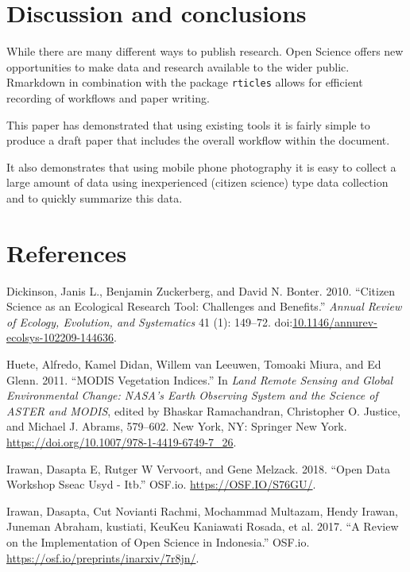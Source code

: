 \documentclass[]{elsarticle} %
\begin{document}
\section{Discussion and conclusions}\label{discussion-and-conclusions}

While there are many different ways to publish research. Open Science
offers new opportunities to make data and research available to the
wider public. Rmarkdown in combination with the package \texttt{rticles}
allows for efficient recording of workflows and paper writing.

This paper has demonstrated that using existing tools it is fairly
simple to produce a draft paper that includes the overall workflow
within the document.

It also demonstrates that using mobile phone photography it is easy to
collect a large amount of data using inexperienced (citizen science)
type data collection and to quickly summarize this data.

\section*{References}\label{references}

\hypertarget{refs}{}
\hypertarget{ref-dickinson_citizen_2010}{}
Dickinson, Janis L., Benjamin Zuckerberg, and David N. Bonter. 2010.
``Citizen Science as an Ecological Research Tool: Challenges and
Benefits.'' \emph{Annual Review of Ecology, Evolution, and Systematics}
41 (1): 149--72.
doi:\href{https://doi.org/10.1146/annurev-ecolsys-102209-144636}{10.1146/annurev-ecolsys-102209-144636}.

\hypertarget{ref-huete_modis_2011}{}
Huete, Alfredo, Kamel Didan, Willem van Leeuwen, Tomoaki Miura, and Ed
Glenn. 2011. ``MODIS Vegetation Indices.'' In \emph{Land Remote Sensing
and Global Environmental Change: NASA's Earth Observing System and the
Science of ASTER and MODIS}, edited by Bhaskar Ramachandran, Christopher
O. Justice, and Michael J. Abrams, 579--602. New York, NY: Springer New
York. \url{https://doi.org/10.1007/978-1-4419-6749-7_26}.

\hypertarget{ref-irawan_workshop_2018}{}
Irawan, Dasapta E, Rutger W Vervoort, and Gene Melzack. 2018. ``Open
Data Workshop Sseac Usyd - Itb.'' OSF.io. \url{https://OSF.IO/S76GU/}.

\hypertarget{ref-irawan_review_2017}{}
Irawan, Dasapta, Cut Novianti Rachmi, Mochammad Multazam, Hendy Irawan,
Juneman Abraham, kustiati, KeuKeu Kaniawati Rosada, et al. 2017. ``A
Review on the Implementation of Open Science in Indonesia.'' OSF.io.
\url{https://osf.io/preprints/inarxiv/7r8jn/}.
\end{document}
